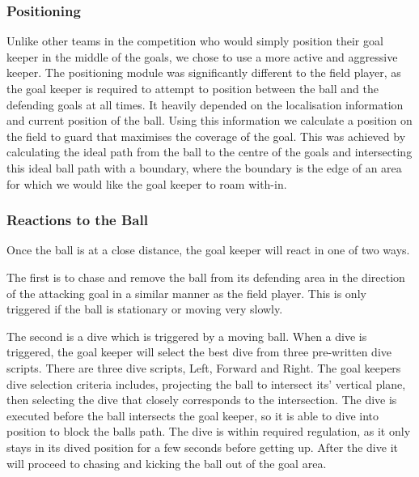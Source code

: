 \subsubsection{Positioning}
Unlike other teams in the competition who would simply position their goal keeper in the middle of the goals, we chose to use a more active and aggressive keeper. The positioning module was significantly different to the field player, as the goal keeper is required to attempt to position between the ball and the defending goals at all times. It heavily depended on the localisation information and current position of the ball. Using this information we calculate a position on the field to guard that maximises the coverage of the goal. This was achieved by calculating the ideal path from the ball to the centre of the goals and intersecting this ideal ball path with a boundary, where the boundary is the edge of an area for which we would like the goal keeper to roam with-in.


\subsubsection{Reactions to the Ball}
Once the ball is at a close distance, the goal keeper will react in one of two ways. 

The first is to chase and remove the ball from its defending area in the direction of the attacking goal in a similar manner as the field player. This is only triggered if the ball is stationary or moving very slowly.

The second is a dive which is triggered by a moving ball. When a dive is triggered, the goal keeper will select the best dive from three pre-written dive scripts. There are three dive scripts, Left, Forward and Right. The goal keepers dive selection criteria includes, projecting the ball to intersect its' vertical plane, then selecting the dive that closely corresponds to the intersection. The dive is executed before the ball intersects the goal keeper, so it is able to dive into position to block the balls path. The dive is within required regulation, as it only stays in its dived position for a few seconds before getting up. After the dive it will proceed to chasing and kicking the ball out of the goal area.
